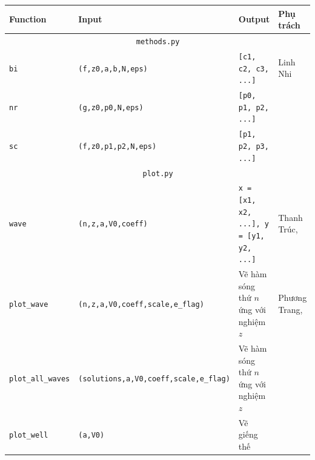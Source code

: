 \documentclass{article}
\begin{document}
\begin{table}[H]
    \begin{tabularx}{\linewidth}{|l|l|X|p{3cm}|}
      \hline
      Function & Input & Output & Phụ trách \\
      \hline
      \multicolumn{4}{|c|}{\texttt{methods.py}} \\
      \hline
      \texttt{bi} & %
      \texttt{(f,z0,a,b,N,eps)} & %
      \texttt{[c1, c2, c3, ...]} & %
      Linh Nhi \\

      \texttt{nr} & %
      \texttt{(g,z0,p0,N,eps)} & %
      \texttt{[p0, p1, p2, ...]} & %
       \\

      \texttt{sc} & %
      \texttt{(f,z0,p1,p2,N,eps)} & %
      \texttt{[p1, p2, p3, ...]} & %
      \\

      \hline
      \multicolumn{4}{|c|}{\texttt{plot.py}} \\
      \hline
      \texttt{wave} & %
      \texttt{(n,z,a,V0,coeff)} & %
      \texttt{x = [x1, x2, ...], y = [y1, y2, ...]} & %
      Thanh Trúc, \\

      \texttt{plot\_wave} & %
      \texttt{(n,z,a,V0,coeff,scale,e\_flag)} & %
      Vẽ hàm sóng thứ \(n\) ứng với nghiệm \(z\) & %
      Phương Trang, \\

      \texttt{plot\_all\_waves} & %
      \texttt{(solutions,a,V0,coeff,scale,e\_flag)} & %
      Vẽ hàm sóng thứ \(n\) ứng với nghiệm \(z\) & %
      \\
      
      \texttt{plot\_well} & %
      \texttt{(a,V0)} & %
      Vẽ giếng thế & %
      \\


\end{tabularx}
\end{table}
\end{document}
